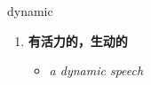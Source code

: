 
\begin{frame}
{\huge dynamic}
\begin{center}
\begin{enumerate}\Large
  \item \textbf{有活力的，生动的}
  \begin{itemize}
    \item \em{\Large{a dynamic speech}}
  \end{itemize}
\end{enumerate}
\end{center}
\end{frame}
